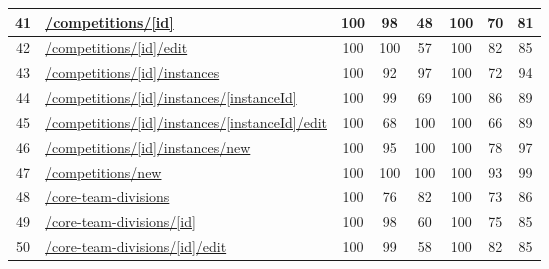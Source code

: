\begin{longtable}{|c|p{5cm}|c|c|c|c|c|c|}
      \hline
      41                                       & \url{/competitions/[id]}                                   & 100              & 98               & 48               & 100              & 70               & 81            \\
      \hline
      42                                       & \url{/competitions/[id]/edit}                              & 100              & 100              & 57               & 100              & 82               & 85            \\
      \hline
      43                                       & \url{/competitions/[id]/instances}                         & 100              & 92               & 97               & 100              & 72               & 94            \\
      \hline
      44                                       & \url{/competitions/[id]/instances/[instanceId]}            & 100              & 99               & 69               & 100              & 86               & 89            \\
      \hline
      45                                       & \url{/competitions/[id]/instances/[instanceId]/edit}       & 100              & 68               & 100              & 100              & 66               & 89            \\
      \hline
      46                                       & \url{/competitions/[id]/instances/new}                     & 100              & 95               & 100              & 100              & 78               & 97            \\
      \hline
      47                                       & \url{/competitions/new}                                    & 100              & 100              & 100              & 100              & 93               & 99            \\
      \hline
      48                                       & \url{/core-team-divisions}                                 & 100              & 76               & 82               & 100              & 73               & 86            \\
      \hline
      49                                       & \url{/core-team-divisions/[id]}                            & 100              & 98               & 60               & 100              & 75               & 85            \\
      \hline
      50                                       & \url{/core-team-divisions/[id]/edit}                       & 100              & 99               & 58               & 100              & 82               & 85            \\

\end{longtable}
